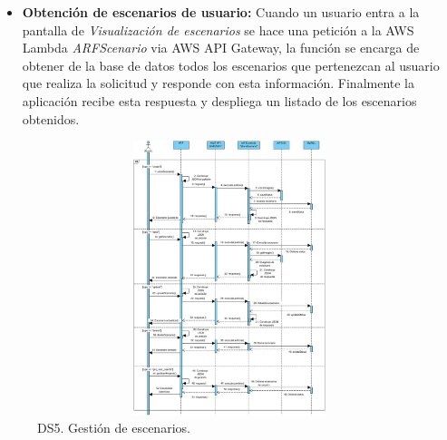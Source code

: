 \begin{itemize}
	\item \textbf{Obtención de escenarios de usuario:} Cuando un usuario entra a la pantalla de \textit{Visualización de escenarios} se hace una petición a la AWS Lambda \textit{ARFScenario} via AWS API Gateway, la función se encarga de obtener de la base de datos todos los escenarios que pertenezcan al usuario que realiza la solicitud y responde con esta información. Finalmente la aplicación recibe esta respuesta y despliega un listado de los escenarios obtenidos.
\end{itemize}

\begin{figure}[h!]
	\centering
	\includegraphics[width=14cm,height=8cm]{imagenes/analisis/ds/CrearEscenario.jpg}
	\caption{DS5. Gestión de escenarios.}
	\label{fig:dsreccuenta}
\end{figure}